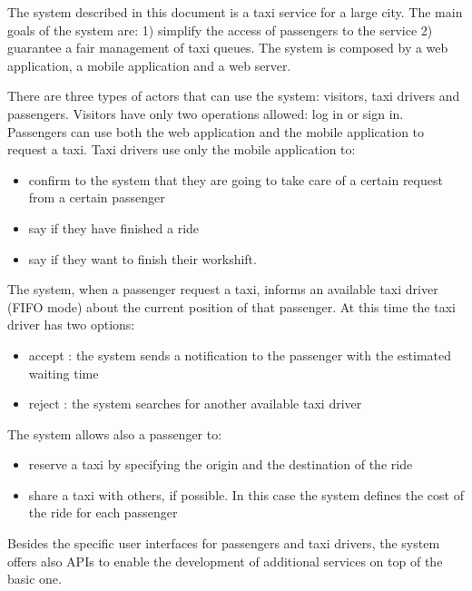 The system described in this document is a taxi service for a large city.
The main goals of the system are: 1) simplify the access of passengers to the service 2) guarantee a fair management of taxi queues.
The system is composed by a web application, a mobile application and a web server.

There are three types of actors that can use the system: visitors, taxi drivers and passengers.
Visitors have only two operations allowed: log in or sign in.
Passengers can use both the web application and the mobile application to request a taxi.
Taxi drivers use only the mobile application to:
\begin{itemize}
	\item confirm to the system that they are going to take care of a certain request from a certain passenger
	\item say if they have finished a ride 
	\item say if they want to finish their workshift.
\end{itemize}

The system, when a passenger request a taxi, informs an available taxi driver (FIFO mode) about the current position of that passenger. 
At this time the taxi driver has two options:
\begin{itemize}
\item accept : the system sends a notification to the passenger with the estimated waiting time
\item reject : the system searches for another available taxi driver
\end{itemize}

The system allows also a passenger to:
\begin{itemize}
\item reserve a taxi by specifying the origin and the destination of the ride
\item share a taxi with others, if possible. In this case the system defines the cost of the ride for each passenger
\end{itemize}

Besides the specific user interfaces for passengers and taxi drivers, the system offers also APIs to enable the development of additional services on top of the basic one.